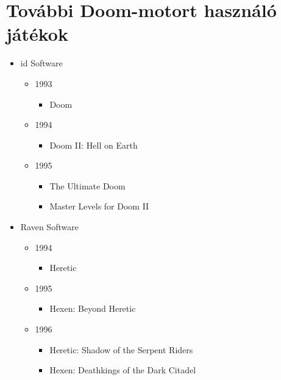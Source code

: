 \documentclass{thesis-ekf}
\theoremstyle{definition}
\theoremstyle{remark}
\begin{document}
\section{További Doom-motort használó játékok}

\begin{itemize}
    \item id Software
        \begin{itemize}
            \item 1993
                \begin{itemize}
                    \item Doom
                \end{itemize}
            \item 1994
                \begin{itemize}
                    \item Doom II: Hell on Earth
                \end{itemize}
            \item 1995
                \begin{itemize}
                    \item The Ultimate Doom
                    \item Master Levels for Doom II
                \end{itemize}
        \end{itemize}
    \item Raven Software
        \begin{itemize}
            \item 1994
                \begin{itemize}
                    \item Heretic
                \end{itemize}
            \item 1995
                \begin{itemize}
                    \item Hexen: Beyond Heretic
                \end{itemize}
            \item 1996
                \begin{itemize}
                    \item Heretic: Shadow of the Serpent Riders
                    \item Hexen: Deathkings of the Dark Citadel
                \end{itemize}
        \end{itemize}

\end{itemize}
\end{document}
